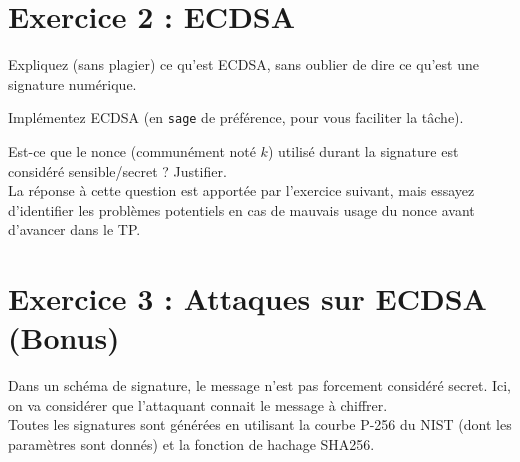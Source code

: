 \documentclass[french,a4paper,11pt]{exam}
\begin{document}
\section*{Exercice 2 : ECDSA}

\begin{questions}
  \question Expliquez (sans plagier) ce qu'est ECDSA, sans oublier de dire ce qu'est une signature numérique. 
  
  \question Implémentez ECDSA (en \texttt{sage} de préférence, pour vous faciliter la tâche).
  
  \question Est-ce que le nonce (communément noté $k$) utilisé durant la signature est considéré sensible/secret ? Justifier. \\
  La réponse à cette question est apportée par l'exercice suivant, mais essayez d'identifier les problèmes potentiels en cas de mauvais usage du nonce avant d'avancer dans le TP.
\end{questions}

\section*{Exercice 3 : Attaques sur ECDSA (Bonus)}

Dans un schéma de signature, le message n'est pas forcement considéré secret. Ici, on va considérer que l'attaquant connait le message à chiffrer.\\
Toutes les signatures sont générées en utilisant la courbe P-256 du NIST (dont les paramètres sont donnés) et la fonction de hachage SHA256.
\end{document}
